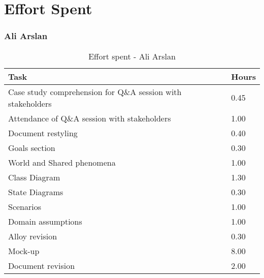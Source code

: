 \chapter{Effort Spent}

\subsection{Ali Arslan}
\renewcommand{\arraystretch}{2}
\begin{longtable}{|m{9cm}|m{1.2cm}|}
\caption{Effort spent - Ali Arslan}\\
\hline
\endfirsthead
\endhead
\hline
\endlastfoot
\rowcolor{green2}
\textbf{Task} & \hfil {\textbf{Hours}}\\
\hline
Case study comprehension for Q\&A session with stakeholders & \hfil 0.45\\
Attendance of Q\&A session with stakeholders & \hfil 1.00\\
Document restyling	& \hfil 0.40\\
Goals section & \hfil 0.30\\
World and Shared phenomena & \hfil 1.00\\
Class Diagram & \hfil 1.30\\
State Diagrams & \hfil 0.30\\
Scenarios & \hfil 1.00\\
Domain assumptions & \hfil 1.00\\
Alloy revision & \hfil 0.30\\
Mock-up  & \hfil 8.00\\
Document revision & \hfil 2.00\\
\hline
\end{longtable}

